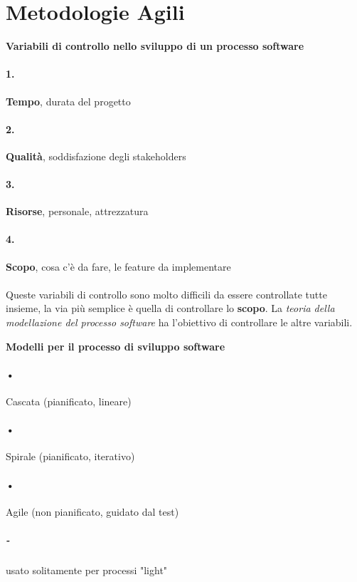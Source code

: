 \section{Metodologie Agili}

\begin{center}
\textbf{Variabili di controllo nello sviluppo di un processo software}
\end{center}
\paragraph{1.}
\textbf{Tempo}, durata del progetto
\paragraph{2.}
\textbf{Qualità}, soddisfazione degli stakeholders
\paragraph{3.}
\textbf{Risorse}, personale, attrezzatura
\paragraph{4.}
\textbf{Scopo}, cosa c'è da fare, le feature da implementare
\\\\Queste variabili di controllo sono molto difficili da essere controllate tutte insieme, la via più semplice è quella di controllare lo \textbf{scopo}. La \textit{teoria della modellazione del processo software} ha l'obiettivo di controllare le altre variabili.
\begin{center}
\textbf{Modelli per il processo di sviluppo software}
\end{center}
\paragraph{•} 
Cascata (pianificato, lineare)
\paragraph{•}
Spirale (pianificato, iterativo)
\paragraph{•}
Agile (non pianificato, guidato dal test)
\subparagraph{-}
usato solitamente per processi "light"

